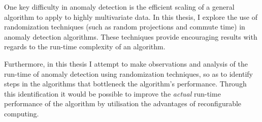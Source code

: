 One key difficulty in anomaly detection is the efficient scaling of a general 
algorithm to apply to highly multivariate data. In this thesis, I explore the 
use of randomization techniques (such as random projections and commute time) 
in anomaly detection algorithms. These techniques provide encouraging results 
with regards to the run-time complexity of an algorithm.

Furthermore, in this thesis I attempt to make observations and analysis of the 
run-time of anomaly detection using randomization techniques, so as to identify
steps in the algorithms that bottleneck the algorithm's performance. Through 
this identification it would be possible to improve the \emph{actual} run-time 
performance of the algorithm by utilisation the advantages of reconfigurable 
computing.
